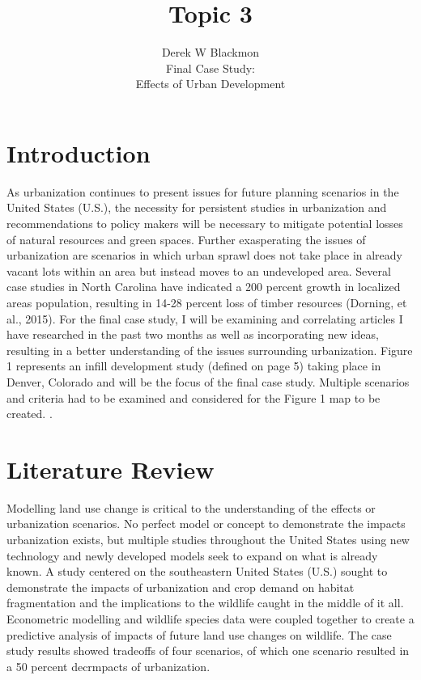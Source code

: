 \documentclass[20pt]{article}
\begin{document}
\title{Topic 3}
\author{Derek W Blackmon\\
Final Case Study:\\
Effects of Urban Development}

\maketitle







\renewcommand*\contentsname{\underline{TABLE OF CONTENTS}}

\newpage

\tableofcontents
\thispagestyle{empty}
\setcounter{page}{0}

\setlength{\parindent}{0cm}

\flushleft
\newpage

\section {Introduction}
As urbanization continues to present issues for future planning scenarios in the United States (U.S.), the necessity for persistent studies in urbanization and recommendations to policy makers will be necessary to mitigate potential losses of natural resources and green spaces. Further exasperating the issues of urbanization are scenarios in which urban sprawl does not take place in already vacant lots within an area but instead moves to an undeveloped area. Several case studies in North Carolina have indicated a 200 percent growth in localized areas population, resulting in 14-28 percent loss of timber resources (Dorning, et al., 2015). For the final case study, I will be examining and correlating articles I have researched in the past two months as well as incorporating new ideas, resulting in a better understanding of the issues surrounding urbanization. Figure 1 represents an infill development study (defined on page 5) taking place in Denver, Colorado and will be the focus of the final case study. Multiple scenarios and criteria had to be examined and considered for the Figure 1 map to be created. . 

\section{Literature Review}
Modelling land use change is critical to the understanding of the effects or urbanization scenarios. No perfect model or concept to demonstrate the impacts urbanization exists, but multiple studies throughout the United States using new technology and newly developed models seek to expand on what is already known. A study centered on the southeastern United States (U.S.) sought to demonstrate the impacts of urbanization and crop demand on habitat fragmentation and the implications to the wildlife caught in the middle of it all. Econometric modelling and wildlife species data were coupled together to create a predictive analysis of impacts of future land use changes on wildlife. The case study results showed tradeoffs of four scenarios, of which one scenario resulted in a 50 percent decrmpacts of urbanization.\\ 
\end{document}
